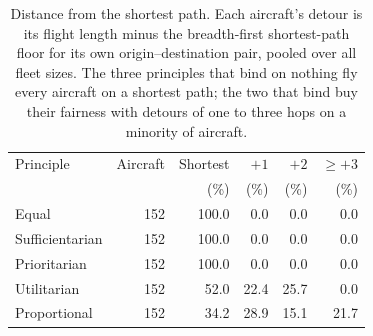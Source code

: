 \begin{table}[t]
\centering
\caption{Distance from the shortest path. Each aircraft's detour is its flight length minus the breadth-first shortest-path floor for its own origin--destination pair, pooled over all fleet sizes. The three principles that bind on nothing fly every aircraft on a shortest path; the two that bind buy their fairness with detours of one to three hops on a minority of aircraft.}
\label{tab:detour}
\begin{tabular}{lrrrrr}
\toprule
Principle & Aircraft & Shortest & $+1$ & $+2$ & $\ge{+}3$ \\
 & & (\%) & (\%) & (\%) & (\%) \\
\midrule
Equal & 152 & 100.0 & 0.0 & 0.0 & 0.0 \\
Sufficientarian & 152 & 100.0 & 0.0 & 0.0 & 0.0 \\
Prioritarian & 152 & 100.0 & 0.0 & 0.0 & 0.0 \\
Utilitarian & 152 & 52.0 & 22.4 & 25.7 & 0.0 \\
Proportional & 152 & 34.2 & 28.9 & 15.1 & 21.7 \\
\bottomrule
\end{tabular}
\end{table}
